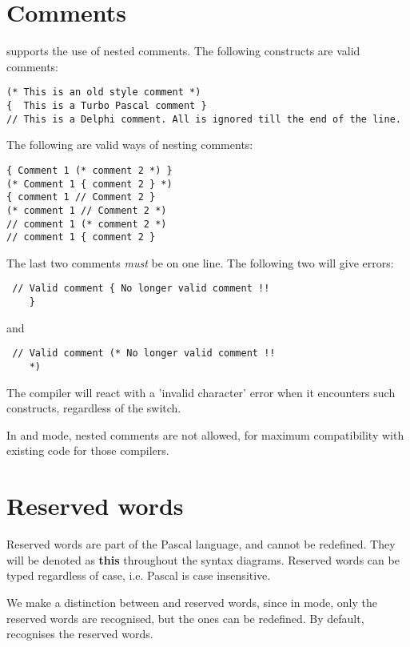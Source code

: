 \section{Comments}
\fpc supports the use of nested comments. The following constructs are valid
comments:
\begin{verbatim}
(* This is an old style comment *)
{  This is a Turbo Pascal comment }
// This is a Delphi comment. All is ignored till the end of the line.
\end{verbatim}
The following are valid ways of nesting comments:
\begin{verbatim}
{ Comment 1 (* comment 2 *) }
(* Comment 1 { comment 2 } *)
{ comment 1 // Comment 2 }
(* comment 1 // Comment 2 *)
// comment 1 (* comment 2 *)
// comment 1 { comment 2 }
\end{verbatim}
The last two comments {\em must} be on one line. The following two will give
errors:
\begin{verbatim}
 // Valid comment { No longer valid comment !!
    }
\end{verbatim}
and
\begin{verbatim}
 // Valid comment (* No longer valid comment !!
    *)
\end{verbatim}
The compiler will react with a 'invalid character' error when it encounters
such constructs, regardless of the  switch.

\begin{remark}
In  and  mode, nested comments are not allowed, for
maximum compatibility with existing code for those compilers.
\end{remark}

\section{Reserved words}
Reserved words are part of the Pascal language, and cannot be redefined.
They will be denoted as {\sffamily\bfseries this} throughout the syntax
diagrams. Reserved words can be typed regardless of case, i.e. Pascal is
case insensitive.

We make a distinction between \tp and \delphi reserved words, since
in  mode, only the \tp reserved words are recognised, 
but the \delphi ones can be redefined. By default, \fpc
recognises the \delphi reserved words.
